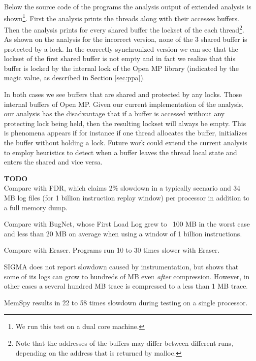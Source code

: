 Below the source code of the programs the analysis output of extended
analysis is shown\footnote{We run this test on a dual core
  machine.}. First the analysis prints the threads along with their
accesses buffers. Then the analysis prints for every shared buffer the
lockset of the each thread\footnote{Note that the addresses of the
  buffers may differ between different runs, depending on the address
  that is returned by malloc.}. As shown on the analysis for the
incorrect version, none of the 3 shared buffer is protected by a
lock. In the correctly synchronized version we can see that the
lockset of the first shared buffer is not empty and in fact we realize
that this buffer is locked by the internal lock of the Open MP library
(indicated by the magic value, as described in Section \ref{sec:ppa}).

In both cases we see buffers that are shared and protected by any
locks. Those internal buffers of Open MP. Given our current
implementation of the analysis, our analysis has the disadvantage that
if a buffer is accessed without any protecting lock being held, then
the resulting lockset will always be empty. This is phenomena appears
if for instance if one thread allocates the buffer, initializes the
buffer without holding a lock. Future work could extend the current
analysis to employ heuristics to detect when a buffer leaves the
thread local state and enters the shared and vice versa.

\textbf{TODO} \\
Compare with FDR, which claims 2\% slowdown in a typically scenario
and 34 MB log files (for 1 billion instruction replay window)
per processor in addition to a full memory dump.

Compare with BugNet, whose First Load Log grew to ~100 MB in the worst
case and less than 20 MB on average when using a window of 1
billion instructions.

Compare with Eraser.  Programs run 10 to 30 times slower with Eraser.

SIGMA does not report slowdown caused by instrumentation, but shows
that some of its logs can grow to hundreds of MB even \emph{after} compression.
However, in other cases a several hundred MB trace is compressed
to a less than 1 MB trace.

MemSpy results in 22 to 58 times slowdown during testing on a single processor.


